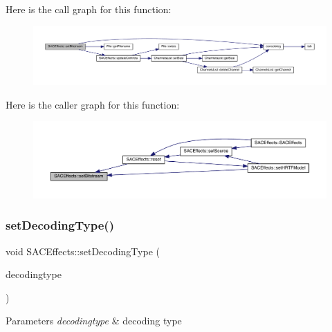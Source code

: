 Here is the call graph for this function\+:
\nopagebreak
\begin{figure}[H]
\begin{center}
\leavevmode
\includegraphics[width=350pt]{class_s_a_c_effects_a4ff113bcbd922362d8fcb9ef61d3641b_cgraph}
\end{center}
\end{figure}
Here is the caller graph for this function\+:
\nopagebreak
\begin{figure}[H]
\begin{center}
\leavevmode
\includegraphics[width=350pt]{class_s_a_c_effects_a4ff113bcbd922362d8fcb9ef61d3641b_icgraph}
\end{center}
\end{figure}
\mbox{\label{class_s_a_c_effects_a07d9b0135f5811a7b6e2d5d98c26fafe}} 
\subsubsection{\texorpdfstring{set\+Decoding\+Type()}{setDecodingType()}}
{\footnotesize\ttfamily void S\+A\+C\+Effects\+::set\+Decoding\+Type (\begin{DoxyParamCaption}\item[{\hyperlink{struct_decoding_type_a8b3854652406458753c9b7da2068b822}{Decoding\+Type\+::decodingtype}}]{decodingtype }\end{DoxyParamCaption})}


\begin{DoxyParams}{Parameters}
{\em decodingtype} & decoding type \\
\hline
\end{DoxyParams}


